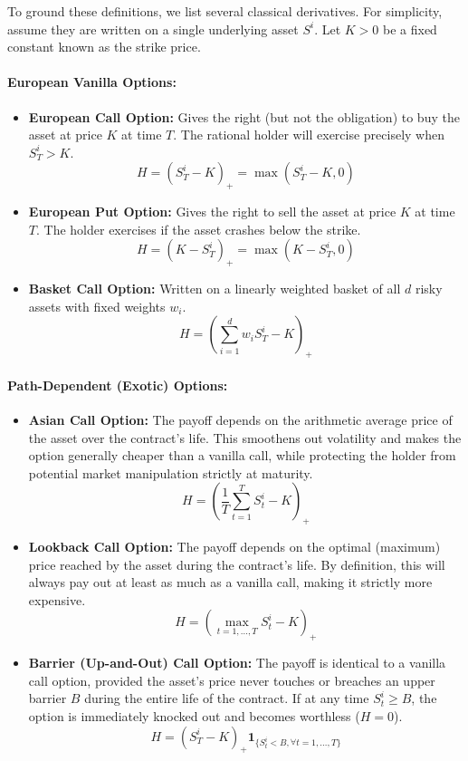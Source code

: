To ground these definitions, we list several classical derivatives. For simplicity, assume they are written on a single underlying asset $S^i$. Let $K > 0$ be a fixed constant known as the strike price.

\paragraph{European Vanilla Options:}
\begin{itemize}
    \item \textbf{European Call Option:} Gives the right (but not the obligation) to buy the asset at price $K$ at time $T$. The rational holder will exercise precisely when $S_T^i > K$.
          $$ H = (S_T^i - K)_+ = \max(S_T^i - K, 0) $$
    \item \textbf{European Put Option:} Gives the right to sell the asset at price $K$ at time $T$. The holder exercises if the asset crashes below the strike.
          $$ H = (K - S_T^i)_+ = \max(K - S_T^i, 0) $$
    \item \textbf{Basket Call Option:} Written on a linearly weighted basket of all $d$ risky assets with fixed weights $w_i$.
          $$ H = \left(\sum_{i=1}^d w_i S_T^i - K\right)_+ $$
\end{itemize}

\paragraph{Path-Dependent (Exotic) Options:}
\begin{itemize}
    \item \textbf{Asian Call Option:} The payoff depends on the arithmetic average price of the asset over the contract's life. This smoothens out volatility and makes the option generally cheaper than a vanilla call, while protecting the holder from potential market manipulation strictly at maturity.
          $$ H = \left( \frac{1}{T} \sum_{t=1}^T S_t^i - K \right)_+ $$
    \item \textbf{Lookback Call Option:} The payoff depends on the optimal (maximum) price reached by the asset during the contract's life. By definition, this will always pay out at least as much as a vanilla call, making it strictly more expensive.
          $$ H = \left( \max_{t=1, \dots, T} S_t^i - K \right)_+ $$
    \item \textbf{Barrier (Up-and-Out) Call Option:} The payoff is identical to a vanilla call option, provided the asset's price never touches or breaches an upper barrier $B$ during the entire life of the contract. If at any time $S_t^i \geq B$, the option is immediately knocked out and becomes worthless ($H = 0$).
          $$ H = (S_T^i - K)_+ \mathbf{1}_{\{S_t^i < B, \forall t = 1, \dots, T\}} $$
\end{itemize}

